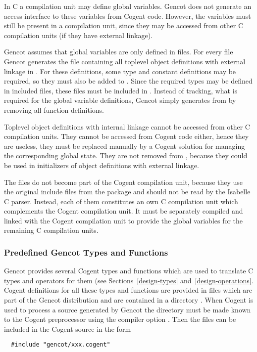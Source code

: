 In C a compilation unit may define global variables. Gencot does not generate an access interface to these variables
from Cogent code. However, the variables must still be present in a compilation unit, since they may be accessed
from other C compilation units (if they have external linkage). 

Gencot assumes that global variables are only defined in  files. For every file  Gencot generates
the file  containing all toplevel object definitions with external linkage in . For 
these definitions, some type and constant definitions may be required, so they must also be added to .
Since the required types may be defined in included  files, these files must be included in .
Instead of tracking, what is required for the global variable definitions, Gencot simply generates 
from  by removing all function definitions. 

Toplevel object definitions with internal linkage cannot be accessed from other C compilation units. They cannot be
accessed from Cogent code either, hence they are useless, they must be replaced manually by a Cogent solution for
managing the corresponding global state. They are not removed from , because they could be used in
initializers of object definitions with external linkage.

The files  do not become part of the Cogent compilation unit, because they use the original 
include files from the package and should not be read by the Isabelle C parser. Instead, each of them constitutes 
an own C compilation unit which complements the Cogent compilation unit. It must be separately compiled and
linked with the Cogent compilation unit to provide the global variables for the remaining C compilation units.

\subsubsection{Predefined Gencot Types and Functions}

Gencot provides several Cogent types and functions which are used to translate C types and operators for them
(see Sections~\ref{design-types} and~\ref{design-operations}. Cogent definitions for all these types and functions 
are provided in files which are part of the Gencot distribution and are contained in a directory .
When Cogent is used to process a source generated by Gencot the directory  must be made known to the 
Cogent preprocessor using the compiler option . Then the files can be included in the Cogent
source in the form
\begin{verbatim}
  #include "gencot/xxx.cogent"
\end{verbatim}

